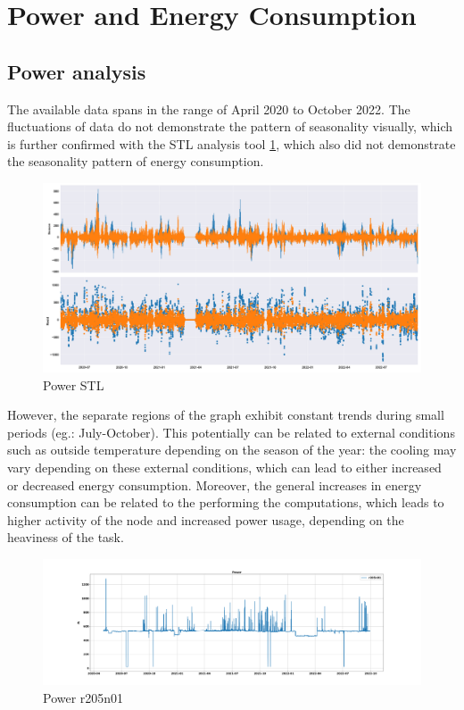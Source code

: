 \section{Power and Energy Consumption}
\noindent

\subsection{Power analysis}
The available data spans in the range of April 2020 to October 2022. 
The fluctuations of data do not demonstrate the pattern of seasonality visually, which is further confirmed with the STL analysis tool \ref{fig:PWR_STL}, which also did not demonstrate the seasonality pattern of energy consumption.

\begin{figure}[H]
    \centering
    \includegraphics[width=1\textwidth]{Figures/PWR_STL.png}
    \caption{Power STL}
    \label{fig:PWR_STL}
\end{figure}

However, the separate regions of the graph exhibit constant trends during small periods (eg.: July-October).
This potentially can be related to external conditions such as outside temperature depending on the season of the year: the cooling may vary depending on these external conditions, which can lead to either increased or decreased energy consumption.
Moreover, the general increases in energy consumption can be related to the performing the computations, which leads to higher activity of the node and increased power usage, depending on the heaviness of the task.

\begin{figure}[H]
    \centering
    \includegraphics[width=1\textwidth]{Figures/PWR_r205n01.png}
    \caption{Power r205n01}
    \label{fig:PWR_r205n01}
\end{figure}


